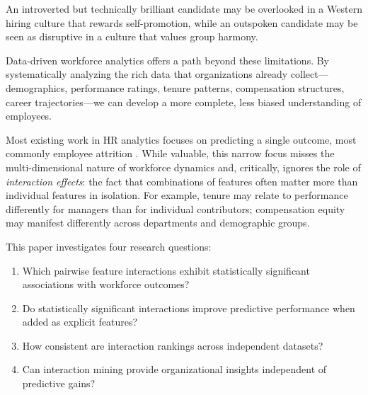 \documentclass[conference]{IEEEtran}
\begin{document}
An introverted but technically brilliant candidate may be overlooked in a Western hiring culture that rewards self-promotion, while an outspoken candidate may be seen as disruptive in a culture that values group harmony.

Data-driven workforce analytics offers a path beyond these limitations. By systematically analyzing the rich data that organizations already collect---demographics, performance ratings, tenure patterns, compensation structures, career trajectories---we can develop a more complete, less biased understanding of employees.

Most existing work in HR analytics focuses on predicting a single outcome, most commonly employee attrition \cite{talebi2025systematic}. While valuable, this narrow focus misses the multi-dimensional nature of workforce dynamics and, critically, ignores the role of \textit{interaction effects}: the fact that combinations of features often matter more than individual features in isolation. For example, tenure may relate to performance differently for managers than for individual contributors; compensation equity may manifest differently across departments and demographic groups.

This paper investigates four research questions:

\begin{enumerate}
    \item[RQ1] Which pairwise feature interactions exhibit statistically significant associations with workforce outcomes?
    \item[RQ2] Do statistically significant interactions improve predictive performance when added as explicit features?
    \item[RQ3] How consistent are interaction rankings across independent datasets?
    \item[RQ4] Can interaction mining provide organizational insights independent of predictive gains?
\end{enumerate}
\end{document}
